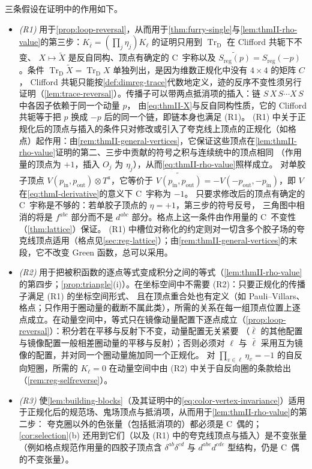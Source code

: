 \documentclass[UTF8,a4paper,11pt,fontset=fandol]{ctexart}
\theoremstyle{cplain}
\theoremstyle{cdefinition}
\theoremstyle{cremark}
\numberwithin{equation}{section}
\newcommand{\TrD}{\operatorname{Tr}_{\mathrm{D}}}   %
\newcommand{\Cconj}[1]{\widetilde{#1}}              %
\begin{document}
三条假设在证明中的作用如下。
\begin{itemize}[leftmargin=1.6em,itemsep=2pt,topsep=3pt]
\item \emph{(R1)} 用于\cref{prop:loop-reversal}，从而用于\cref{thm:furry-single}与\cref{lem:thmII-rho-value}的第三步：$K_{\bar\ell}=(\prod_j\eta_j)K_\ell$ 的证明只用到 $\TrD$ 在 Clifford 共轭下不变、
      $X\mapsto\Cconj X$ 是反自同构、顶点有确定的 C~宇称以及 $\Cconj{S_{\mathrm{reg}}(p)}=S_{\mathrm{reg}}(-p)$。条件 $\TrD\Cconj X=\TrD X$ 单独列出，是因为维数正规化中没有 $4\times4$ 的矩阵 $C$，
      Clifford 共轭只能按\cref{def:dimreg-trace}代数地定义，迹的反序不变性须另行证明（\cref{lem:trace-reversal}）。传播子可以带两点抵消项的插入：链 $S\,X\,S\cdots X\,S$ 中各因子依赖于同一个动量 $p$，
      由\cref{eq:thmII-X}与反自同构性质，它的 Clifford 共轭等于把 $p$ 换成 $-p$ 后的同一个链，即链本身也满足 (R1)。
      (R1) 中关于正规化后的顶点与插入的条件只对修改或引入了夸克线上顶点的正规化（如格点）起作用：由\cref{rem:thmII-general-vertices}，它保证这些顶点在\cref{lem:thmII-rho-value}证明的第二、三步中贡献的符号之积与连续统中的顶点相同
      （作用量的顶点为 $+1$，插入 $O_j$ 为 $\eta_j$），从而\cref{eq:thmII-rho-value}照样成立。
      对单胶子顶点 $V(p_{\mathrm{in}},p_{\mathrm{out}})\otimes T^a$，它等价于 $\Cconj{V(p_{\mathrm{in}},p_{\mathrm{out}})}=-V(-p_{\mathrm{out}},-p_{\mathrm{in}})$，即 $V$ 在\cref{eq:thmI-derivative}的意义下 C~宇称为 $-1$。
      只要求修改后的顶点有确定的 C~宇称是不够的：若单胶子顶点的 $\eta=+1$，第三步的符号反号，
      三角图中相消的将是 $f^{abc}$ 部分而不是 $d^{abc}$ 部分。格点上这一条件由作用量的 C~不变性（\cref{thm:lattice}）保证。
      (R1) 中槽位对称化的约定则对一切含多个胶子场的夸克线顶点适用（格点见\cref{sec:reg-lattice}）；由\cref{rem:thmII-general-vertices}的末段，它不改变 Green 函数，总可以采用。
\item \emph{(R2)} 用于把被积函数的逐点等式变成积分之间的等式（\cref{lem:thmII-rho-value}的第四步；\cref{prop:triangle}(i)）。在坐标空间中不需要 (R2)：只要正规化的传播子满足 (R1) 的坐标空间形式、
      且在顶点重合处也有定义（如 Pauli--Villars、格点；只作用于圈动量的截断不属此类），所需的关系在每一组顶点位置上逐点成立。在动量空间中，等式只在镜像动量配置下逐点成立（\cref{prop:loop-reversal}）：积分若在平移与反射下不变，动量配置无关紧要
      （$\bar\ell$ 的其他配置与镜像配置一般相差圈动量的平移与反射）；否则必须对 $\ell$ 与 $\bar\ell$ 采用互为镜像的配置，并对同一个圈动量施加同一个正规化。
      对 $\prod_{v\in\ell}\eta_v=-1$ 的自反向短圈，所需的 $K_\ell=0$ 在动量空间中由 (R2) 中关于自反向圈的条款给出（\cref{rem:reg-selfreverse}）。
\item \emph{(R3)} 使\cref{lem:building-blocks}（及其证明中的\cref{eq:color-vertex-invariance}）适用于正规化后的规范场、鬼场顶点与抵消项，从而用于\cref{lem:thmII-rho-value}的第二步：
      夸克圈以外的色张量（包括抵消项的）都必须是 C~偶的；\cref{cor:selection}(b) 还用到它们（以及 (R1) 中的夸克线顶点与插入）是不变张量
      （例如格点规范作用量的四胶子顶点含 $\delta^{ab}\delta^{cd}$ 与 $d^{abe}d^{cde}$ 型结构，仍是 C~偶的不变张量）。
\end{itemize}
\end{document}

